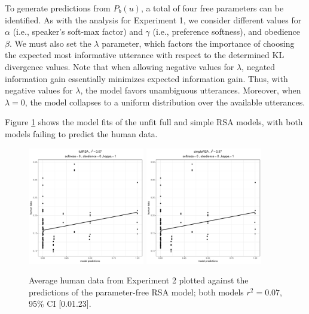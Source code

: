\documentclass[10pt,a4paper]{article}
\newcommand{\gcs}[1]{\textcolor{blue}{[gcs: #1]}}
\begin{document}
To generate predictions from $P_b(u)$, a total of four free parameters can be identified. 
As with the analysis for Experiment 1, we consider different values for $\alpha$ (i.e., speaker's soft-max factor) and $\gamma$ (i.e., preference softness), and obedience $\beta$. 
We must also set the $\lambda$ parameter, which factors the importance of choosing the expected most informative utterance with respect to the determined KL divergence values.
Note that when allowing negative values for $\lambda$, negated information gain essentially minimizes expected information gain.
Thus, with negative values for $\lambda$, the model favors unambiguous utterances. 
Moreover, when $\lambda=0$, the model collapses to a uniform distribution over the available utterances.



Figure \ref{simple-full-x3} shows the model fits of the unfit full and simple RSA models, with both models failing to predict the human data.


\begin{figure}[ht]
	\centering
	\includegraphics[width=2in]{images/x3_m1.pdf}
	\includegraphics[width=2in]{images/x3_m7.pdf}
	\caption{Average human data from Experiment 2 plotted against the predictions of the parameter-free RSA model; both models $r^{2}=0.07$, 95\% CI [0.01.23].}\label{simple-full-x3}
\end{figure}
\end{document}
